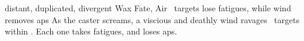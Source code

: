   {distant, duplicated, divergent}%
  {Wax}%
  {Fate, Air}%
  {}%
  {\spellArea\ targets lose  \glspl{fatigue}, while wind removes  \glspl{ap}}%
  {
    As the caster screams, a viscious and deathly wind ravages \spellArea\ targets within \spellRange.
    Each one takes  \glspl{fatigue}, and loses  \glspl{ap}.
  }

